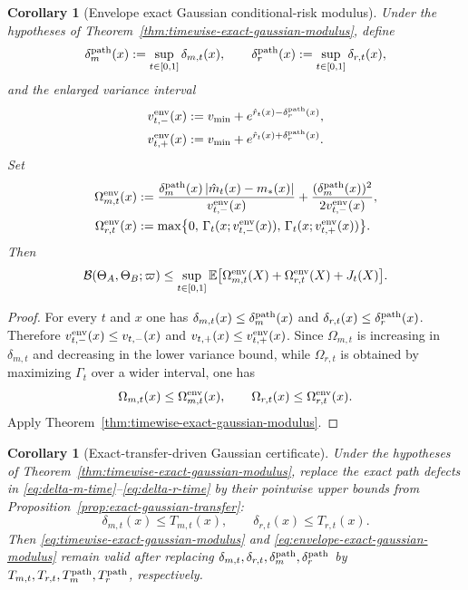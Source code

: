 \documentclass[11pt]{article}
\newtheorem{corollary}[theorem]{Corollary}
\theoremstyle{definition}
\newcommand{\E}{\mathbb{E}}
\newcommand{\abs}[1]{\left\lvert #1 \right\rvert}
\newcommand{\cB}{\mathcal{B}}
\begin{document}
\begin{corollary}[Envelope exact Gaussian conditional-risk modulus]
\label{cor:envelope-exact-gaussian-modulus}
Under the hypotheses of Theorem~\ref{thm:timewise-exact-gaussian-modulus}, define
\[
  \delta_m^{\rm path}(x):=\sup_{t\in[0,1]} \delta_{m,t}(x),
  \qquad
  \delta_r^{\rm path}(x):=\sup_{t\in[0,1]} \delta_{r,t}(x),
\]
and the enlarged variance interval
\begin{align}
  v_{t,-}^{\rm env}(x)
  &:=
  v_{\min}+e^{\hat r_t(x)-\delta_r^{\rm path}(x)},
  \label{eq:v-minus-env}
  \\
  v_{t,+}^{\rm env}(x)
  &:=
  v_{\min}+e^{\hat r_t(x)+\delta_r^{\rm path}(x)}.
  \label{eq:v-plus-env}
\end{align}
Set
\begin{align}
  \Omega_{m,t}^{\rm env}(x)
  &:=
  \frac{\delta_m^{\rm path}(x)\abs{\hat m_t(x)-m_\ast(x)}}{v_{t,-}^{\rm env}(x)}
  +
  \frac{(\delta_m^{\rm path}(x))^2}{2v_{t,-}^{\rm env}(x)},
  \label{eq:Omega-m-env}
  \\
  \Omega_{r,t}^{\rm env}(x)
  &:=
  \max\bigl\{
    0,\,
    \Gamma_t(x;v_{t,-}^{\rm env}(x)),\,
    \Gamma_t(x;v_{t,+}^{\rm env}(x))
  \bigr\}.
  \label{eq:Omega-r-env}
\end{align}
Then
\begin{equation}
  \cB(\Theta_A,\Theta_B;\varpi)
  \le
  \sup_{t\in[0,1]}
  \E\bigl[
    \Omega_{m,t}^{\rm env}(X)+\Omega_{r,t}^{\rm env}(X)+J_t(X)
  \bigr].
  \label{eq:envelope-exact-gaussian-modulus}
\end{equation}
\end{corollary}

\begin{proof}
For every $t$ and $x$ one has
$\delta_{m,t}(x)\le \delta_m^{\rm path}(x)$ and
$\delta_{r,t}(x)\le \delta_r^{\rm path}(x)$. Therefore
$v_{t,-}^{\rm env}(x)\le v_{t,-}(x)$ and
$v_{t,+}(x)\le v_{t,+}^{\rm env}(x)$. Since
$\Omega_{m,t}$ is increasing in $\delta_{m,t}$ and decreasing in the lower
variance bound, while $\Omega_{r,t}$ is obtained by maximizing $\Gamma_t$ over a
wider interval, one has
\[
  \Omega_{m,t}(x)\le \Omega_{m,t}^{\rm env}(x),
  \qquad
  \Omega_{r,t}(x)\le \Omega_{r,t}^{\rm env}(x).
\]
Apply Theorem~\ref{thm:timewise-exact-gaussian-modulus}.
\end{proof}

\begin{corollary}[Exact-transfer-driven Gaussian certificate]
\label{cor:exact-transfer-driven-gaussian-certificate}
Under the hypotheses of Theorem~\ref{thm:timewise-exact-gaussian-modulus}, replace
the exact path defects in \eqref{eq:delta-m-time}--\eqref{eq:delta-r-time} by
their pointwise upper bounds from Proposition~\ref{prop:exact-gaussian-transfer}:
\[
  \delta_{m,t}(x)\le T_{m,t}(x),
  \qquad
  \delta_{r,t}(x)\le T_{r,t}(x).
\]
Then \eqref{eq:timewise-exact-gaussian-modulus} and
\eqref{eq:envelope-exact-gaussian-modulus} remain valid after replacing
$\delta_{m,t},\delta_{r,t},\delta_m^{\rm path},\delta_r^{\rm path}$ by
$T_{m,t},T_{r,t},T_m^{\rm path},T_r^{\rm path}$, respectively.
\end{corollary}
\end{document}
